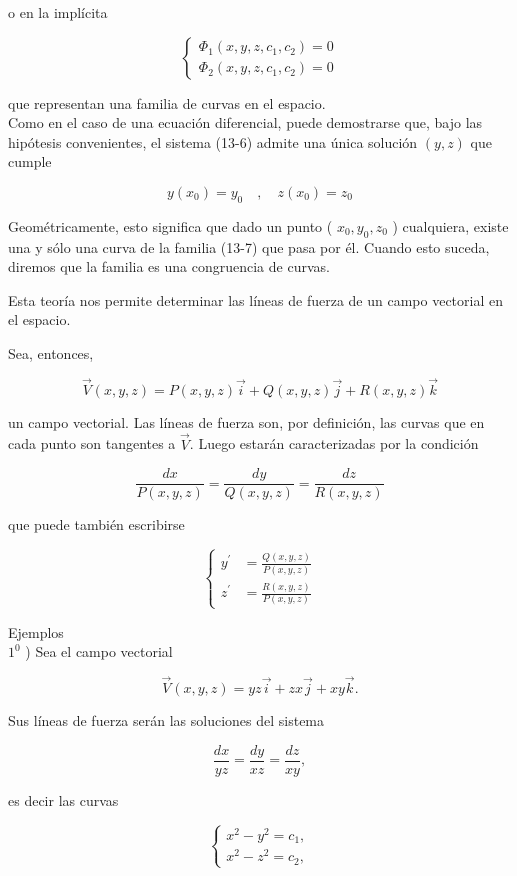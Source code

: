 \documentclass[10pt]{article}
\theoremstyle{plain}
\theoremstyle{definition}
\theoremstyle{remark}
\begin{document}
o en la implícita

\[
\left\{\begin{array}{l}
\Phi_{1}\left(x, y, z, c_{1}, c_{2}\right)=0  \tag{13-7}\\
\Phi_{2}\left(x, y, z, c_{1}, c_{2}\right)=0
\end{array}\right.
\]

que representan una familia de curvas en el espacio.\\
Como en el caso de una ecuación diferencial, puede demostrarse que, bajo las hipótesis convenientes, el sistema (13-6) admite una única solución $(y, z)$ que cumple

$$
y\left(x_{0}\right)=y_{0} \quad, \quad z\left(x_{0}\right)=z_{0}
$$

Geométricamente, esto significa que dado un punto ( $x_{0}, y_{0}, z_{0}$ ) cualquiera, existe una y sólo una curva de la familia (13-7) que pasa por él. Cuando esto suceda, diremos que la familia es una congruencia de curvas.

Esta teoría nos permite determinar las líneas de fuerza de un campo vectorial en el espacio.

Sea, entonces,

$$
\vec{V}(x, y, z)=P(x, y, z) \vec{i}+Q(x, y, z) \vec{j}+R(x, y, z) \vec{k}
$$

un campo vectorial. Las líneas de fuerza son, por definición, las curvas que en cada punto son tangentes a $\vec{V}$. Luego estarán caracterizadas por la condición

$$
\frac{d x}{P(x, y, z)}=\frac{d y}{Q(x, y, z)}=\frac{d z}{R(x, y, z)}
$$

que puede también escribirse

$$
\left\{\begin{aligned}
y^{\prime} & =\frac{Q(x, y, z)}{P(x, y, z)} \\
z^{\prime} & =\frac{R(x, y, z)}{P(x, y, z)}
\end{aligned}\right.
$$

Ejemplos\\
$1^{0}$ ) Sea el campo vectorial

$$
\vec{V}(x, y, z)=y z \vec{i}+z x \vec{j}+x y \vec{k} .
$$

Sus líneas de fuerza serán las soluciones del sistema

$$
\frac{d x}{y z}=\frac{d y}{x z}=\frac{d z}{x y},
$$

es decir las curvas

$$
\left\{\begin{array}{l}
x^{2}-y^{2}=c_{1}, \\
x^{2}-z^{2}=c_{2},
\end{array}\right.
$$
\end{document}
